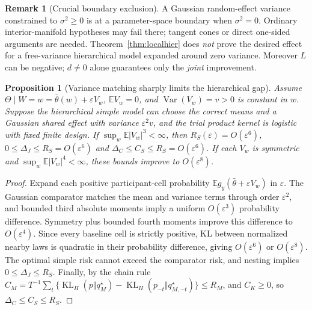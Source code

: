 \documentclass[11pt,letterpaper]{article}
\theoremstyle{plain}
\newtheorem{proposition}[theorem]{Proposition}
\theoremstyle{definition}
\newtheorem{remark}[theorem]{Remark}
\newcommand{\KL}{\operatorname{KL}}
\newcommand{\Var}{\operatorname{Var}}
\newcommand{\E}{\mathbb E}
\begin{document}
\begin{remark}[Crucial boundary exclusion]
A Gaussian random-effect variance constrained to $\sigma^2\ge0$ is at a parameter-space boundary when $\sigma^2=0$. Ordinary interior-manifold hypotheses may fail there; tangent cones or direct one-sided arguments are needed. Theorem~\ref{thm:localhier} does \emph{not} prove the desired effect for a free-variance hierarchical model expanded around zero variance. Moreover $L$ can be negative; $d\ne0$ alone guarantees only the \emph{joint} improvement.
\end{remark}

\begin{proposition}[Variance matching sharply limits the hierarchical gap]\label{prop:variance}
Assume $\Theta\mid W=w=\bar\theta(w)+\varepsilon V_w$, $\E V_w=0$, and $\Var(V_w)=v>0$ is constant in $w$. Suppose the hierarchical simple model can choose the correct means and a Gaussian shared effect with variance $\varepsilon^2v$, and the trial product kernel is logistic with fixed finite design. If $\sup_w\E|V_w|^3<\infty$, then $R_S(\varepsilon)=O(\varepsilon^6)$, $0\le\Delta_J\le R_S=O(\varepsilon^6)$ and $\Delta_C\le C_S\le R_S=O(\varepsilon^6)$. If each $V_w$ is symmetric and $\sup_w\E|V_w|^4<\infty$, these bounds improve to $O(\varepsilon^8)$.
\end{proposition}
\begin{proof}
Expand each positive participant-cell probability $\E g_y(\bar\theta+\varepsilon V_w)$ in $\varepsilon$. The Gaussian comparator matches the mean and variance terms through order $\varepsilon^2$, and bounded third absolute moments imply a uniform $O(\varepsilon^3)$ probability difference. Symmetry plus bounded fourth moments improve this difference to $O(\varepsilon^4)$. Since every baseline cell is strictly positive, KL between normalized nearby laws is quadratic in their probability difference, giving $O(\varepsilon^6)$ or $O(\varepsilon^8)$. The optimal simple risk cannot exceed the comparator risk, and nesting implies $0\le\Delta_J\le R_S$. Finally, by the chain rule $C_M=T^{-1}\sum_t\{\KL_H(p\Vert q_M^\star)-\KL_H(p_{-t}\Vert q^\star_{M,-t})\}\le R_M$, and $C_K\ge0$, so $\Delta_C\le C_S\le R_S$.
\end{proof}
\end{document}
